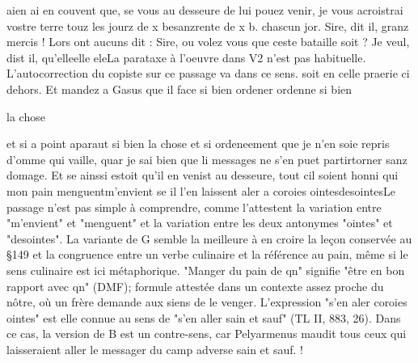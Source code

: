 \documentclass{article}
\begin{document}
\begin{pages}
                     aien ai en couvent que, se vous 
                     au desseure de lui pouez venir, je vous acroistrai vostre 
                     terre touz les jourz de x besanzrente de x b. chascun jor.
               Sire, dit il, granz mercis ! Lors ont aucuns
               dit : Sire, ou volez vous que ceste bataille soit
                  ?
               Je veul, dist il, 
                     qu'elleelle eleLa parataxe à l'oeuvre dans V2 n'est pas
                     habituelle. L'autocorrection du copiste sur ce passage va dans ce sens.
                  soit en celle praerie ci dehors. Et
                  mandez a Gasus que il 
                     face 
                           si bien ordener
                     ordenne si bien
                  
                     la chose
                  
                     et si a point
                     aparaut si bien la chose et si ordeneement que je n’en soie repris d’omme qui vaille, quar je sai bien que li messages ne s’en puet 
                     partirtorner sanz domage. Et se ainssi estoit qu’il en venist au desseure, tout cil
                  soient honni qui mon pain 
                     menguentm’envient se il l’en laissent aler a coroies 
                     ointesdesointesLe passage n'est pas simple à comprendre, comme
                     l'attestent la variation entre "m'envient" et "menguent" et la variation entre
                     les deux antonymes "ointes" et "desointes". La variante de G semble la
                     meilleure à en croire la leçon conservée au §149 et la congruence entre un
                     verbe culinaire et la référence au pain, même si le sens culinaire est ici
                     métaphorique. "Manger du pain de qn" signifie "être en bon rapport avec qn"
                     (DMF); formule attestée dans un contexte assez proche du nôtre, où un frère
                     demande aux siens de le venger. L'expression "s'en aler coroies ointes" est
                     elle connue au sens de "s'en aller sain et sauf" (TL II, 883, 26). Dans ce cas,
                     la version de B est un contre-sens, car Pelyarmenus maudit tous ceux qui
                     laisseraient aller le messager du camp adverse sain et sauf.
               ! \pend
            

\end{pages}
\end{document}
